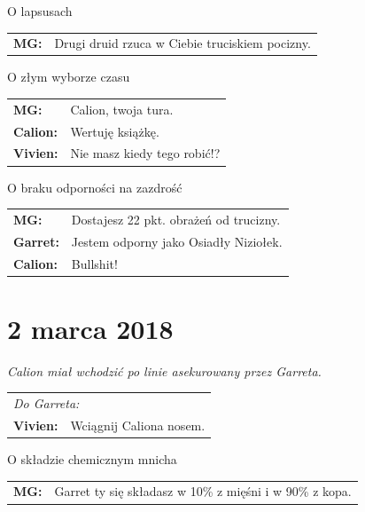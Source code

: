 \documentclass[10pt,twoside,twocolumn]{book}
\begin{document}
\begin{rpg-quotebox}{O lapsusach}
   \begin{tabularx}{\columnwidth}{lX}
      \textbf{MG:} & Drugi druid rzuca w Ciebie truciskiem pocizny.\\
   \end{tabularx}
\end{rpg-quotebox}

\begin{rpg-quotebox}{O złym wyborze czasu}
   \begin{tabularx}{\columnwidth}{lX}
      \textbf{MG:} & Calion, twoja tura.\\
      \textbf{Calion:} & Wertuję książkę.\\
      \textbf{Vivien:} & Nie masz kiedy tego robić!?\\
   \end{tabularx}
\end{rpg-quotebox}

\begin{rpg-quotebox}{O braku odporności na zazdrość}
   \begin{tabularx}{\columnwidth}{lX}
      \textbf{MG:} & Dostajesz 22 pkt. obrażeń od trucizny.\\
      \textbf{Garret:} & Jestem odporny jako Osiadły Niziołek.\\
      \textbf{Calion:} & Bullshit!\\
   \end{tabularx}
\end{rpg-quotebox}

\section*{2 marca 2018}

\begin{rpg-quotebox}{}
   \textit{Calion miał wchodzić po linie asekurowany przez Garreta.}\\

   \begin{tabularx}{\columnwidth}{lX}
      \multicolumn{2}{l}{\textit{Do Garreta:}}\\
      \textbf{Vivien:} & Wciągnij Caliona nosem.\\
   \end{tabularx}
\end{rpg-quotebox}

\begin{rpg-quotebox}{O składzie chemicznym mnicha}
   \begin{tabularx}{\columnwidth}{lX}
      \textbf{MG:} & Garret ty się składasz w 10\% z mięśni i w 90\% z kopa.\\
   \end{tabularx}
\end{rpg-quotebox}
\end{document}
